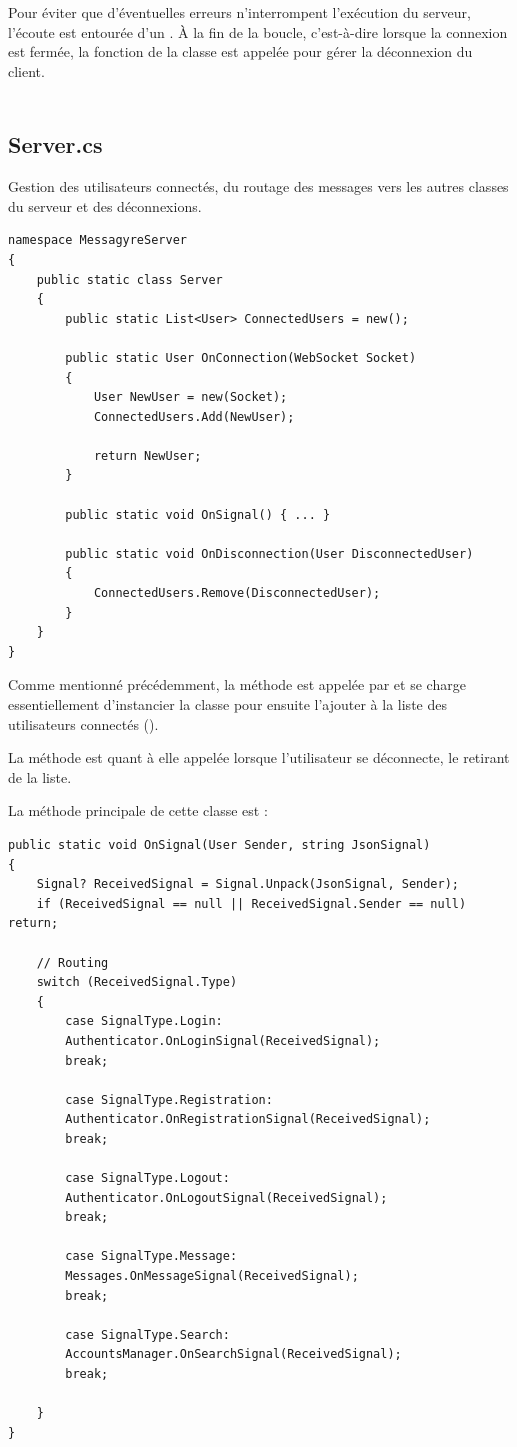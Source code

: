 \documentclass[12pt]{report}
\begin{document}
	Pour éviter que d'éventuelles erreurs n'interrompent l'exécution du serveur, l'écoute est entourée d'un . À la fin de la boucle, c'est-à-dire lorsque la connexion est fermée, la fonction  de la classe  est appelée pour gérer la déconnexion du client.
	\\\\
	\subsection{Server.cs}
	
	Gestion des utilisateurs connectés, du routage des messages vers les autres classes du serveur et des déconnexions.
	
	\begin{verbatim}
namespace MessagyreServer
{
	public static class Server
	{
		public static List<User> ConnectedUsers = new();
		
		public static User OnConnection(WebSocket Socket)
		{
			User NewUser = new(Socket);
			ConnectedUsers.Add(NewUser);
			
			return NewUser;
		}
		
		public static void OnSignal() { ... }
		
		public static void OnDisconnection(User DisconnectedUser)
		{
			ConnectedUsers.Remove(DisconnectedUser);
		}
	}
}
	\end{verbatim}
	
	Comme mentionné précédemment, la méthode  est appelée par  et se charge essentiellement d'instancier la classe  pour ensuite l'ajouter à la liste des utilisateurs connectés ().
	
	La méthode  est quant à elle appelée lorsque l'utilisateur se déconnecte, le retirant de la liste.
	
	La méthode principale de cette classe est :
	
	\begin{verbatim}
public static void OnSignal(User Sender, string JsonSignal)
{
	Signal? ReceivedSignal = Signal.Unpack(JsonSignal, Sender);
	if (ReceivedSignal == null || ReceivedSignal.Sender == null) return;
	
	// Routing
	switch (ReceivedSignal.Type)
	{
		case SignalType.Login:
		Authenticator.OnLoginSignal(ReceivedSignal);
		break;
		
		case SignalType.Registration:
		Authenticator.OnRegistrationSignal(ReceivedSignal);
		break;
		
		case SignalType.Logout:
		Authenticator.OnLogoutSignal(ReceivedSignal);
		break;
		
		case SignalType.Message:
		Messages.OnMessageSignal(ReceivedSignal);
		break;
		
		case SignalType.Search:
		AccountsManager.OnSearchSignal(ReceivedSignal);
		break;
		
	}
}
	\end{verbatim}
	
\end{document}
